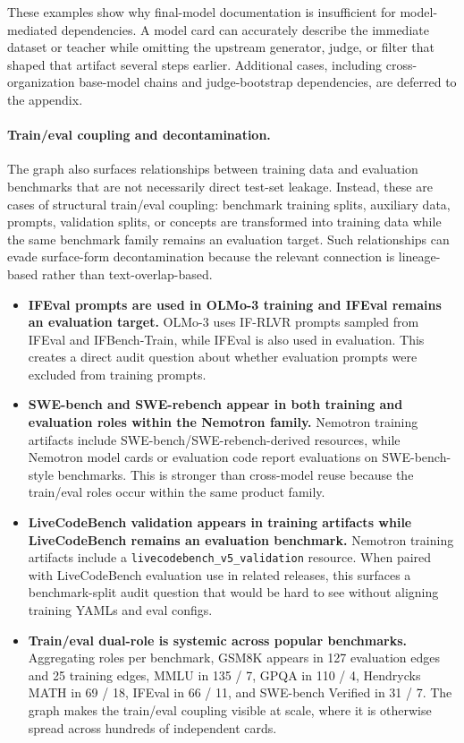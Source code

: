 These examples show why final-model documentation is insufficient for model-mediated dependencies. A model card can accurately describe the immediate dataset or teacher while omitting the upstream generator, judge, or filter that shaped that artifact several steps earlier. Additional cases, including cross-organization base-model chains and judge-bootstrap dependencies, are deferred to the appendix.

\paragraph{Train/eval coupling and decontamination.}

The graph also surfaces relationships between training data and evaluation benchmarks that are not necessarily direct test-set leakage. Instead, these are cases of structural train/eval coupling: benchmark training splits, auxiliary data, prompts, validation splits, or concepts are transformed into training data while the same benchmark family remains an evaluation target. Such relationships can evade surface-form decontamination because the relevant connection is lineage-based rather than text-overlap-based.

\begin{itemize}
    \item \textbf{IFEval prompts are used in OLMo-3 training and IFEval remains an evaluation target.}
    OLMo-3 uses IF-RLVR prompts sampled from IFEval and IFBench-Train, while IFEval is also used in evaluation. This creates a direct audit question about whether evaluation prompts were excluded from training prompts.

    \item \textbf{SWE-bench and SWE-rebench appear in both training and evaluation roles within the Nemotron family.}
    Nemotron training artifacts include SWE-bench/SWE-rebench-derived resources, while Nemotron model cards or evaluation code report evaluations on SWE-bench-style benchmarks. This is stronger than cross-model reuse because the train/eval roles occur within the same product family.

    \item \textbf{LiveCodeBench validation appears in training artifacts while LiveCodeBench remains an evaluation benchmark.}
    Nemotron training artifacts include a \texttt{livecodebench\_v5\_validation} resource. When paired with LiveCodeBench evaluation use in related releases, this surfaces a benchmark-split audit question that would be hard to see without aligning training YAMLs and eval configs.

    \item \textbf{Train/eval dual-role is systemic across popular benchmarks.}
    Aggregating roles per benchmark, GSM8K appears in 127 evaluation edges and 25 training edges, MMLU in 135 / 7, GPQA in 110 / 4, Hendrycks MATH in 69 / 18, IFEval in 66 / 11, and SWE-bench Verified in 31 / 7. The graph makes the train/eval coupling visible at scale, where it is otherwise spread across hundreds of independent cards.
\end{itemize}

